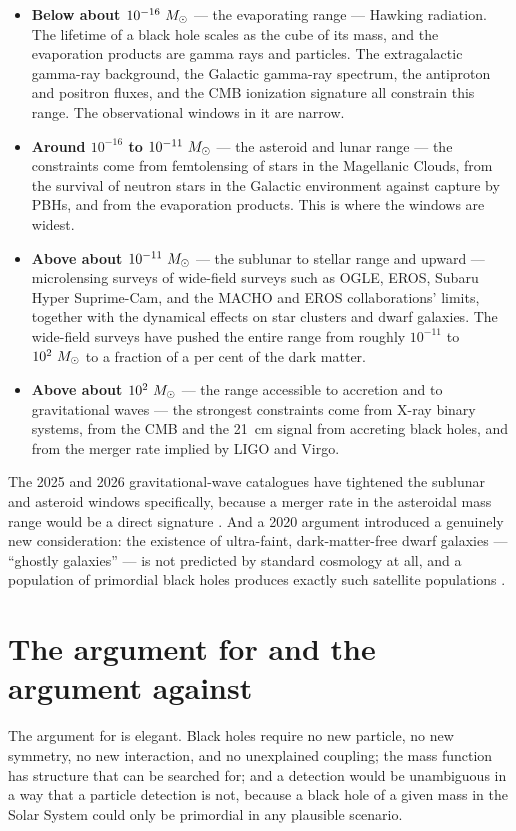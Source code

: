 \begin{itemize}
\item \textbf{Below about $10^{-16}\ \Msun$} --- the evaporating range ---
Hawking radiation. The lifetime of a black hole scales as the cube of its
mass, and the evaporation products are gamma rays and particles. The
extragalactic gamma-ray background, the Galactic gamma-ray spectrum, the
antiproton and positron fluxes, and the CMB ionization signature all
constrain this range. The observational windows in it are narrow.
\item \textbf{Around $10^{-16}$ to $10^{-11}\ \Msun$} --- the asteroid and
lunar range --- the constraints come from femtolensing of stars in the
Magellanic Clouds, from the survival of neutron stars in the Galactic
environment against capture by PBHs, and from the evaporation products. This
is where the windows are widest.
\item \textbf{Above about $10^{-11}\ \Msun$} --- the sublunar to stellar
range and upward --- microlensing surveys of wide-field surveys such as
OGLE, EROS, Subaru Hyper Suprime-Cam, and the MACHO and EROS collaborations'
limits, together with the dynamical effects on star clusters and dwarf
galaxies. The wide-field surveys have pushed the entire range from roughly
$10^{-11}$ to $10^2\ \Msun$ to a fraction of a per cent of the dark matter.
\item \textbf{Above about $10^2\ \Msun$} --- the range accessible to
accretion and to gravitational waves --- the strongest constraints come from
X-ray binary systems, from the CMB and the 21~cm signal from accreting
black holes, and from the merger rate implied by LIGO and Virgo.
\end{itemize}

The 2025 and 2026 gravitational-wave catalogues have tightened the
sublunar and asteroid windows specifically, because a merger rate in the
asteroidal mass range would be a direct signature .
And a 2020 argument introduced a genuinely new consideration: the existence
of ultra-faint, dark-matter-free dwarf galaxies --- ``ghostly galaxies'' ---
is not predicted by standard cosmology at all, and a population of
primordial black holes produces exactly such satellite populations
.

\section{The argument for and the argument against}The argument for is
elegant. Black holes require no new particle, no new symmetry, no new
interaction, and no unexplained coupling; the mass function has structure
that can be searched for; and a detection would be unambiguous in a way
that a particle detection is not, because a black hole of a given mass in
the Solar System could only be primordial in any plausible scenario.

